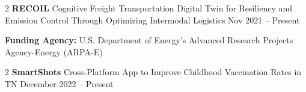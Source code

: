 \documentclass[10pt, letterpaper]{article}
\newenvironment{highlights}{
    \begin{itemize}[
        topsep=0.10 cm,
        parsep=0.10 cm,
        partopsep=0pt,
        itemsep=0pt,
        leftmargin=0 cm + 10pt
    ]
}{
    \end{itemize}
} %
\newenvironment{twocolentry}[2][]{
    \onecolentry
    \def\secondColumn{#2}
    \setcolumnwidth{\fill, 4.5 cm}
    \begin{paracol}{2}
}{
    \switchcolumn \raggedleft \secondColumn
    \end{paracol}
    \endonecolentry
} %
\begin{document}
        \begin{twocolentry}{Nov 2021 – Present} \textbf{RECOIL} \textbar Cognitive Freight Transportation Digital Twin for Resiliency and Emission Control Through Optimizing Intermodal Logistics \end{twocolentry} 
            \textbf{Funding Agency:} U.S. Department of Energy’s Advanced Research Projects Agency-Energy (ARPA-E) 
\vspace{0.1cm} 
        \begin{twocolentry}{December 2022 – Present} \textbf{SmartShots} \textbar Cross-Platform App to Improve Childhood Vaccination Rates in TN \end{twocolentry}
\end{document}

